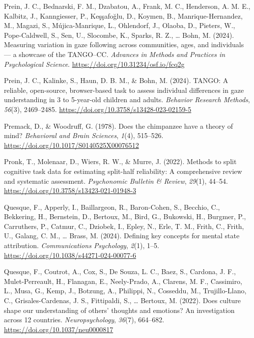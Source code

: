 \documentclass[
]{scrbook}
\newlength{\cslhangindent}
\newenvironment{CSLReferences}[2] %
 {\begin{list}{}{%
  \setlength{\itemindent}{0pt}
  \setlength{\leftmargin}{0pt}
  \setlength{\parsep}{0pt}
  \ifodd #1
   \setlength{\leftmargin}{\cslhangindent}
   \setlength{\itemindent}{-1\cslhangindent}
  \fi
  \setlength{\itemsep}{#2\baselineskip}}}
 {\end{list}}
\begin{document}
\begin{CSLReferences}{1}{0}
Prein, J. C., Bednarski, F. M., Dzabatou, A., Frank, M. C., Henderson, A. M. E., Kalbitz, J., Kanngiesser, P., Keşşafoğlu, D., Koymen, B., Manrique-Hernandez, M., Magazi, S., Mújica-Manrique, L., Ohlendorf, J., Olaoba, D., Pieters, W., Pope-Caldwell, S., Sen, U., Slocombe, K., Sparks, R. Z., \ldots{} Bohn, M. (2024). Measuring variation in gaze following across communities, ages, and individuals --- a showcase of the {TANGO}--{CC}. \emph{Advances in Methods and Practices in Psychological Science}. \url{https://doi.org/10.31234/osf.io/fcq2g}

Prein, J. C., Kalinke, S., Haun, D. B. M., \& Bohn, M. (2024). {TANGO}: {A} reliable, open-source, browser-based task to assess individual differences in gaze understanding in 3 to 5-year-old children and adults. \emph{Behavior Research Methods}, \emph{56}(3), 2469--2485. \url{https://doi.org/10.3758/s13428-023-02159-5}

Premack, D., \& Woodruff, G. (1978). Does the chimpanzee have a theory of mind? \emph{Behavioral and Brain Sciences}, \emph{1}(4), 515--526. \url{https://doi.org/10.1017/S0140525X00076512}

Pronk, T., Molenaar, D., Wiers, R. W., \& Murre, J. (2022). Methods to split cognitive task data for estimating split-half reliability: {A} comprehensive review and systematic assessment. \emph{Psychonomic Bulletin \& Review}, \emph{29}(1), 44--54. \url{https://doi.org/10.3758/s13423-021-01948-3}

Quesque, F., Apperly, I., Baillargeon, R., Baron-Cohen, S., Becchio, C., Bekkering, H., Bernstein, D., Bertoux, M., Bird, G., Bukowski, H., Burgmer, P., Carruthers, P., Catmur, C., Dziobek, I., Epley, N., Erle, T. M., Frith, C., Frith, U., Galang, C. M., \ldots{} Brass, M. (2024). Defining key concepts for mental state attribution. \emph{Communications Psychology}, \emph{2}(1), 1--5. \url{https://doi.org/10.1038/s44271-024-00077-6}

Quesque, F., Coutrot, A., Cox, S., De Souza, L. C., Baez, S., Cardona, J. F., Mulet-Perreault, H., Flanagan, E., Neely-Prado, A., Clarens, M. F., Cassimiro, L., Musa, G., Kemp, J., Botzung, A., Philippi, N., Cosseddu, M., Trujillo-Llano, C., Grisales-Cardenas, J. S., Fittipaldi, S., \ldots{} Bertoux, M. (2022). Does culture shape our understanding of others' thoughts and emotions? {An} investigation across 12 countries. \emph{Neuropsychology}, \emph{36}(7), 664--682. \url{https://doi.org/10.1037/neu0000817}


\end{CSLReferences}
\end{document}
